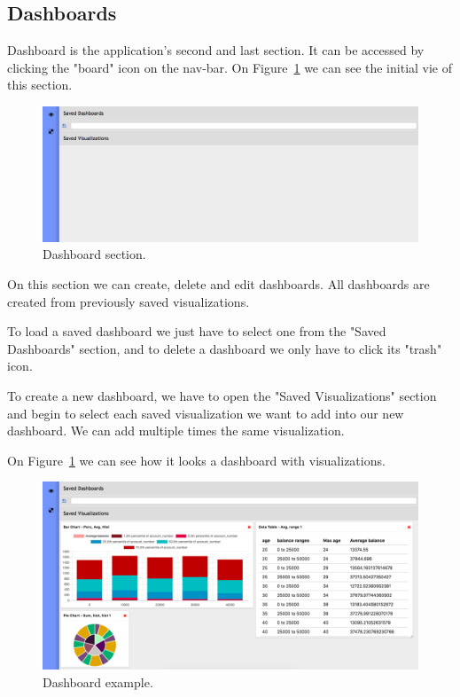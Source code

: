 \documentclass[a4paper, 12pt, english]{book}
\begin{document}
\subsection{Dashboards}
\label{sec:results-dashboards}
Dashboard is the application's second and last section. It can be accessed by clicking the "board" icon on the nav-bar. On Figure~\ref{fig:dashboards-initial-view} we can see the initial vie of this section.
\begin{figure}
  \centering
  \includegraphics[width=16cm, keepaspectratio]{img/dashboards-initial-view.png}
  \caption{Dashboard section.}
  \label{fig:dashboards-initial-view}
\end{figure}

On this section we can create, delete and edit dashboards. All dashboards are created from previously saved visualizations.

To load a saved dashboard we just have to select one from the "Saved Dashboards" section, and to delete a dashboard we only have to click its "trash" icon.

To create a new dashboard, we have to open the "Saved Visualizations" section and begin to select each saved visualization we want to add into our new dashboard. We can add multiple times the same visualization.

On Figure~\ref{fig:dashboards-initial-view} we can see how it looks a dashboard with visualizations.
\begin{figure}
  \centering
  \includegraphics[width=16cm, keepaspectratio]{img/dashboard-example.png}
  \caption{Dashboard example.}
  \label{fig:dashboard-example}
\end{figure}
\end{document}
